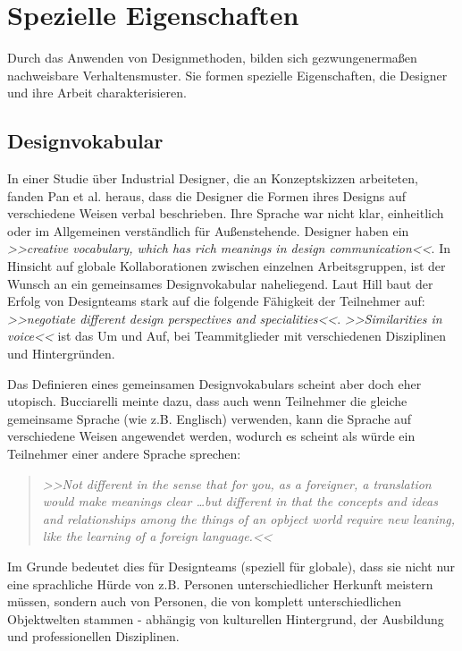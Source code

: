 \section{Spezielle Eigenschaften}
Durch das Anwenden von Designmethoden, bilden sich gezwungenermaßen nachweisbare Verhaltensmuster. Sie formen spezielle Eigenschaften, die Designer und ihre Arbeit charakterisieren.

\subsection{Designvokabular} 
In einer Studie über Industrial Designer, die an Konzeptskizzen arbeiteten, fanden Pan et al. \citep{Pan:2002} heraus, dass die Designer die Formen ihres Designs auf verschiedene Weisen verbal beschrieben. Ihre Sprache war nicht klar, einheitlich oder im Allgemeinen verständlich für Außenstehende. Designer haben ein \emph{>>creative vocabulary, which has rich meanings in design communication<<}\citep{Pan:2002}. In Hinsicht auf globale Kollaborationen zwischen einzelnen Arbeitsgruppen, ist der Wunsch an ein gemeinsames Designvokabular naheliegend. Laut Hill \citep{Hill:2001} baut der Erfolg von Designteams stark auf die folgende Fähigkeit der Teilnehmer auf: \emph{>>negotiate different design perspectives and specialities<<}. \emph{>>Similarities in voice<<} ist das Um und Auf, bei Teammitglieder mit verschiedenen Disziplinen und Hintergründen.

\medskip Das Definieren eines gemeinsamen Designvokabulars scheint aber doch eher utopisch. Bucciarelli meinte dazu, dass auch wenn Teilnehmer die gleiche gemeinsame Sprache (wie z.B. Englisch) verwenden, kann die Sprache auf verschiedene Weisen angewendet werden, wodurch es scheint als würde ein Teilnehmer einer andere Sprache sprechen:

\begin{quote}
	\textsl{>>Not different in the sense that for you, as a foreigner, a translation would make meanings clear \ldots but different in that the concepts and ideas and relationships among the things of an opbject world require new leaning, like the learning of a foreign language.<<}
\begin{flushright}\citep{Bucciarelli:2002}\end{flushright}
\end{quote}

Im Grunde bedeutet dies für Designteams (speziell für globale), dass sie nicht nur eine sprachliche Hürde von z.B. Personen unterschiedlicher Herkunft meistern müssen, sondern auch von Personen, die von komplett unterschiedlichen Objektwelten stammen - abhängig von kulturellen Hintergrund, der Ausbildung und professionellen Disziplinen.

